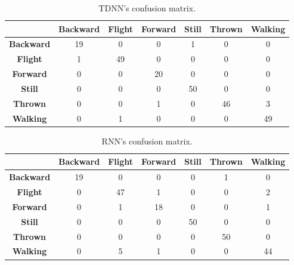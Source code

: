\begin{table}[ht!]
	\centering
	\begin{tabular}{c|cccccc}
		& \textbf{Backward} & \textbf{Flight} & \textbf{Forward} & \textbf{Still} & \textbf{Thrown} & \textbf{Walking} \\ \hline
		\textbf{Backward} & 19                & 0               & 0                & 1              & 0               & 0                \\
		\rowcolor[HTML]{EFEFEF} 
		\textbf{Flight}   & 1                 & 49              & 0                & 0              & 0               & 0                \\
		\textbf{Forward}  & 0                 & 0               & 20               & 0              & 0               & 0                \\
		\rowcolor[HTML]{EFEFEF} 
		\textbf{Still}    & 0                 & 0               & 0                & 50             & 0               & 0                \\
		\textbf{Thrown}   & 0                 & 0               & 1                & 0              & 46              & 3                \\
		\rowcolor[HTML]{EFEFEF} 
		\textbf{Walking}  & 0                 & 1               & 0                & 0              & 0               & 49              
	\end{tabular}
	\caption{TDNN's confusion matrix.}
\end{table}

\begin{table}[ht!]
	\centering
	\begin{tabular}{c|cccccc}
		\textbf{}         & \textbf{Backward} & \textbf{Flight} & \textbf{Forward} & \textbf{Still} & \textbf{Thrown} & \textbf{Walking} \\ \hline
		\textbf{Backward} & 19                & 0               & 0                & 0              & 1               & 0                \\
		\rowcolor[HTML]{EFEFEF} 
		\textbf{Flight}   & 0                 & 47              & 1                & 0              & 0               & 2                \\
		\textbf{Forward}  & 0                 & 1               & 18               & 0              & 0               & 1                \\
		\rowcolor[HTML]{EFEFEF} 
		\textbf{Still}    & 0                 & 0               & 0                & 50             & 0               & 0                \\
		\textbf{Thrown}   & 0                 & 0               & 0                & 0              & 50              & 0                \\
		\rowcolor[HTML]{EFEFEF} 
		\textbf{Walking}  & 0                 & 5               & 1                & 0              & 0               & 44              
	\end{tabular}
	\caption{RNN's confusion matrix.}
\end{table}

